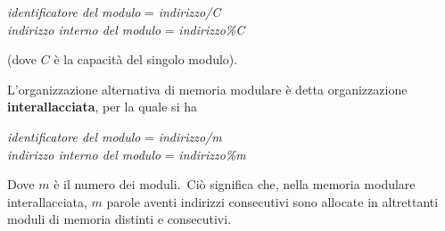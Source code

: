 \begin{center}
    \textit{identificatore del modulo} = \textit{indirizzo{\slash}C} \\
    \textit{indirizzo interno del modulo} = \textit{indirizzo\%C}
\end{center}

\noindent (dove $C$ è la capacità del singolo modulo).

\noindent L'organizzazione alternativa di memoria modulare è detta organizzazione \textbf{interallacciata}, per la quale si ha

\begin{center}
    \textit{identificatore del modulo} = \textit{indirizzo{\slash}m} \\
    \textit{indirizzo interno del modulo} = \textit{indirizzo\%m}
\end{center}

\noindent Dove $m$ è il numero dei moduli.\
Ciò significa che, nella memoria modulare interallacciata, $m$ parole aventi indirizzi consecutivi sono allocate in altrettanti moduli di memoria distinti e consecutivi.

